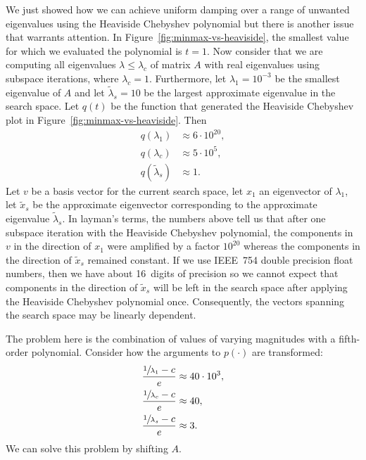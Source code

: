 \documentclass[%
	paper=a4,
	fontsize=10pt,
	DIV11,BCOR10mm,
	numbers=noenddot,
	abstract=yes
]{scrartcl}
\newcommand{\almost}[1]{\widetilde{#1}}
\theoremstyle{definition}
\begin{document}
We just showed how we can achieve uniform damping over a range of unwanted
eigenvalues using the Heaviside Chebyshev polynomial but there is another issue
that warrants attention. In Figure~\ref{fig:minmax-vs-heaviside}, the smallest
value for which we evaluated the polynomial is $t = 1$. Now consider that we are
computing all eigenvalues $\lambda \leq \lambda_c$ of matrix $A$ with real
eigenvalues using subspace iterations, where $\lambda_c = 1$.  Furthermore, let
$\lambda_1 = 10^{-3}$ be the smallest eigenvalue of $A$ and let
$\almost{\lambda}_s = 10$ be the largest approximate eigenvalue in the search
space. Let $q(t)$ be the function that generated the Heaviside Chebyshev plot in
Figure~\ref{fig:minmax-vs-heaviside}. Then
\begin{align*}
	q(\lambda_1) &\approx 6 \cdot 10^{20}, \\
	q(\lambda_c) &\approx 5 \cdot 10^5, \\
	q(\almost{\lambda}_s) &\approx 1.
\end{align*}
Let $v$ be a basis vector for the current search space, let $x_1$ an eigenvector
of $\lambda_1$, let $\almost{x}_s$ be the approximate eigenvector corresponding
to the approximate eigenvalue $\almost{\lambda}_s$. In layman's terms, the
numbers above tell us that after one subspace iteration with the Heaviside
Chebyshev polynomial, the components in $v$ in the direction of $x_1$ were
amplified by a factor $10^{20}$ whereas the components in the
direction of $\almost{x}_s$ remained constant. If we use IEEE~754 double
precision float numbers, then we have about 16~digits of precision
\cite[§2.7.2]{Golub2012} so we cannot expect that components in the direction of
$\almost{x}_s$ will be left in the search space after applying the Heaviside
Chebyshev polynomial once.  Consequently, the vectors spanning the search space
may be linearly dependent.

The problem here is the combination of values of varying magnitudes with a
fifth-order polynomial. Consider how the arguments to $p(\cdot)$ are
transformed:
\begin{align*}
	\frac{\sfrac{1}{\lambda_1} - c}{e} &\approx 40 \cdot 10^3, \\
	\frac{\sfrac{1}{\lambda_c} - c}{e} &\approx 40, \\
	\frac{\sfrac{1}{\lambda_s} - c}{e} &\approx 3.
\end{align*}
We can solve this problem by shifting $A$.

\printbibliography
\end{document}
